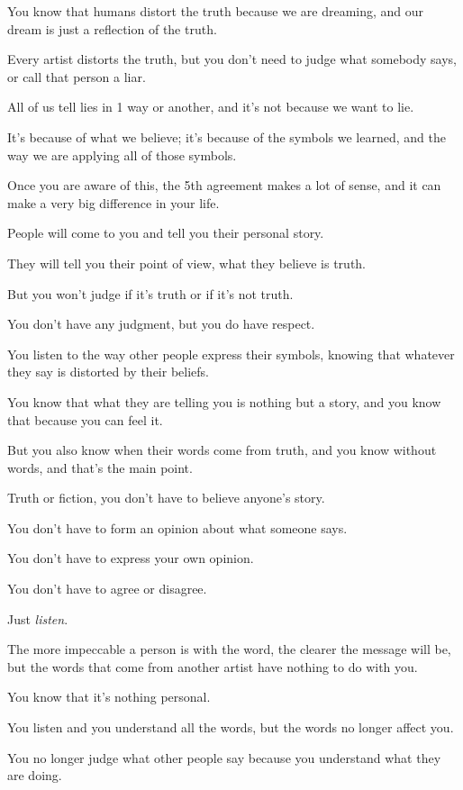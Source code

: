 \documentclass{article}
\numberwithin{equation}{section}
\begin{document}
You know that humans distort the truth because we are dreaming, and our dream is just a reflection of the truth.

%
Every artist distorts the truth, but you don't need to judge what somebody says, or call that person a liar.

All of us tell lies in 1 way or another, and it's not because we want to lie.

It's because of what we believe; it's because of the symbols we learned, and the way we are applying all of those symbols.

Once you are aware of this, the 5th agreement makes a lot of sense, and it can make a very big difference in your life.

%
People will come to you and tell you their personal story.

They will tell you their point of view, what they believe is truth.

But you won't judge if it's truth or if it's not truth.

You don't have any judgment, but you do have respect.

You listen to the way other people express their symbols, knowing that whatever they say is distorted by their beliefs.

You know that what they are telling you is nothing but a story, and you know that because you can feel it.


But you also know when their words come from truth, and you know without words, and that's the main point.

%
Truth or fiction, you don't have to believe anyone's story.

You don't have to form an opinion about what someone says.

You don't have to express your own opinion.

You don't have to agree or disagree.

Just \textit{listen}.

The more impeccable a person is with the word, the clearer the message will be, but the words that come from another artist have nothing to do with you.

You know that it's nothing personal.

You listen and you understand all the words, but the words no longer affect you.

You no longer judge what other people say because you understand what they are doing.
\end{document}
